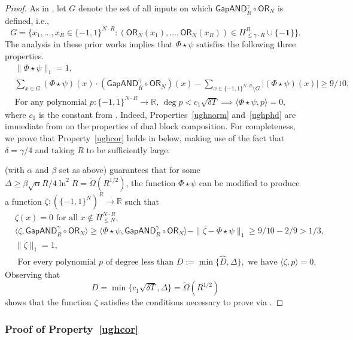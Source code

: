 \documentclass[11pt, letterpaper, fleqn]{article}
\theoremstyle{plain}
\newcommand{\R}{\mathbb{R}}
\newcommand{\OR}{\mathsf{ OR}}
\newcommand{\bits}{\{-1,1\}}
\newcommand{\ls}{\star}
\newcommand{\tOmega}{\tilde{\Omega}}
\newcommand{\GAPAND}{\mathsf{GapAND}}
\begin{document}
\begin{proof}
As in , let $G$ denote the set of all inputs on
which $\GAPAND_{R}^{\gamma} \circ \OR_N$ is defined,
i.e., $$G=\{x_1, \dots, x_R \in \bits^{N \cdot R} \colon (\OR_N(x_1), \dots, \OR_N(x_R)) \in
H_{\leq \gamma \cdot R}^R \cup \{\mathbf{-1}\}\}.$$
The analysis in these prior works \cite{bt14,bchtv} implies that 
$\Phi \ls \psi$ satisfies the following three properties.
\begin{align} &\|\Phi \ls \psi \|_1=1, \label{ughnorm} \\
&\sum_{x \in G}  ( \Phi \ls \psi)(x) \cdot \left(\GAPAND_{R}^{\gamma} \circ \OR_N\right)(x) - \sum_{x \in\bits^{N \cdot R} \setminus G} |(\Phi \ls \psi)(x)|
\geq 9/10,  \label{ughcor} \\
&\text{For any polynomial } p \colon \bits^{N\cdot R} \to \R\text{, } \deg p < c_1\sqrt{\delta T} \implies \langle \Phi \ls \psi, p \rangle = 0,   \label{ughphd}
\end{align}
where $c_1$ is the constant from . Indeed, Properties~\eqref{ughnorm} and~\eqref{ughphd} are immediate from  on the properties of dual block composition. For completeness, we prove that Property~\eqref{ughcor} holds in  below, making use of the fact that $\delta = \gamma/4$ and taking $R$ to be sufficiently large.

 (with $\alpha$ and $\beta$ set as above) guarantees that for some $\Delta \ge \beta \sqrt{\alpha} R / 4\ln^2 R = \tOmega(R^{1/2})$, the function $\Phi \ls \psi$ can be modified to produce a function $\zeta : (\bits^N)^R \to \R$ such that
\begin{align*}
&\zeta(x) = 0 \text{ for all } x \not\in H_{\le N}^{N \cdot R}, \\
&\langle \zeta, \GAPAND_{R}^{\gamma} \circ \OR_N \rangle \ge \langle \Phi \ls \psi, \GAPAND_{R}^{\gamma} \circ \OR_N \rangle - \|\zeta - \Phi \ls \psi\|_1 \ge 9/10 - 2/9 > 1/3, \\
&\|\zeta\|_1 = 1, \\
& \text{ For every polynomial } p \text{ of degree less than } D:=\min\{\hat{D}, \Delta\}, \text{ we have }\langle \zeta, p \rangle = 0. 
\end{align*}
Observing that
\[D =  \min\{c_1\sqrt{\delta T}, \Delta\} = \tOmega(R^{1/2})\]
shows that the function $\zeta$ satisfies the conditions necessary to prove  via .
\end{proof}

\subsubsection{Proof of Property~\eqref{ughcor}}
\label{sec:gap-and-corr}
\end{document}
